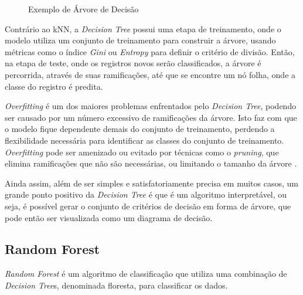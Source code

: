 \begin{figure}[ht!]
  \centering
  \caption{\textmd{Exemplo de Árvore de Decisão}}
  \label{fig:dtree-exemplo}
\end{figure}

Contrário ao kNN, a \textit{Decision Tree} possui uma etapa de treinamento, onde o modelo utiliza um conjunto de treinamento para construir a árvore, usando métricas como o índice \textit{Gini} ou \textit{Entropy} para definir o critério de divisão. Então, na etapa de teste, onde os registros novos serão classificados, a árvore é percorrida, através de suas ramificações, até que se encontre um nó folha, onde a classe do registro é predita.

\textit{Overfitting} é um dos maiores problemas enfrentados pelo \textit{Decision Tree}, podendo ser causado por um número excessivo de ramificações da árvore. Isto faz com que o modelo fique dependente demais do conjunto de treinamento, perdendo a flexibilidade necessária para identificar as classes do conjunto de treinamento. \textit{Overfitting} pode ser amenizado ou evitado por técnicas como o \textit{pruning}, que elimina ramificações que não são necessárias, ou limitando o tamanho da árvore \cite{dtree}. 

Ainda assim, além de ser simples e satisfatoriamente precisa em muitos casos, um grande ponto positivo da \textit{Decision Tree} é que é um algoritmo interpretável, ou seja, é possível gerar o conjunto de critérios de decisão em forma de árvore, que pode então ser visualizada como um diagrama de decisão. 

\subsection{Random Forest}
\label{subsec:contexto-random-forest}

\textit{Random Forest} é um algoritmo de classificação que utiliza uma combinação de \textit{Decision Tree}s, denominada floresta, para classificar os dados. 

